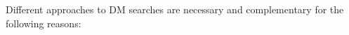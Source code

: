 \documentclass[nofootinbib]{article}
\begin{document}


Different approaches to DM searches are necessary and complementary for the following reasons: 
\end{document}
